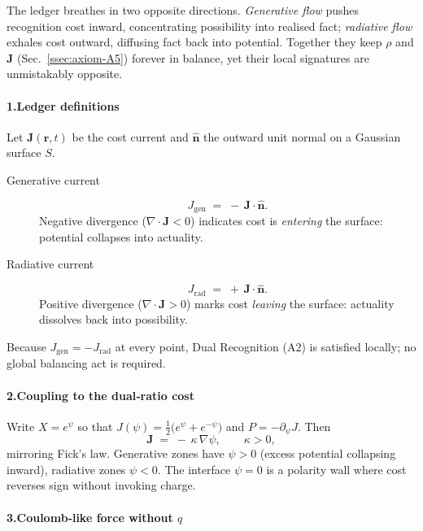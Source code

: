 \documentclass[11pt,oneside]{book}
\begin{document}
The ledger breathes in two opposite directions.  
\emph{Generative flow} pushes recognition cost inward, concentrating possibility into realised fact; \emph{radiative flow} exhales cost outward, diffusing fact back into potential.  
Together they keep $\rho$ and $\mathbf J$ (Sec.~\ref{ssec:axiom-A5}) forever in balance, yet their local signatures are unmistakably opposite.  

\paragraph*{1.\;Ledger definitions}

Let $\mathbf J(\mathbf r,t)$ be the cost current and $\widehat{\mathbf n}$ the outward unit normal on a Gaussian surface $S$.

\begin{description}
\item[Generative current]  
  \[
    J_{\text{gen}}
    \;=\;
    -\,\mathbf J\!\cdot\!\widehat{\mathbf n}.
  \]
  Negative divergence ($\nabla\!\cdot\!\mathbf J<0$) indicates cost is
  \emph{entering} the surface: potential collapses into actuality.

\item[Radiative current]  
  \[
    J_{\text{rad}}
    \;=\;
    +\,\mathbf J\!\cdot\!\widehat{\mathbf n}.
  \]
  Positive divergence ($\nabla\!\cdot\!\mathbf J>0$) marks cost
  \emph{leaving} the surface: actuality dissolves back into possibility.
\end{description}

\noindent
Because $J_{\text{gen}}=-J_{\text{rad}}$ at every point, Dual
Recognition (A2) is satisfied locally; no global balancing act is
required.

\paragraph*{2.\;Coupling to the dual‐ratio cost}

Write $X=e^{\psi}$ so that
$J(\psi)=\tfrac12\bigl(e^{\psi}+e^{-\psi}\bigr)$ and
$P=-\partial_\psi J$.  
Then
\[
  \mathbf J
  \;=\;
  -\,\kappa\,\nabla\psi,
  \qquad
  \kappa>0,
\]
mirroring Fick’s law.  
Generative zones have $\psi>0$ (excess potential collapsing inward),
radiative zones $\psi<0$.  
The interface $\psi=0$ is a polarity wall where cost reverses sign
without invoking charge.

\paragraph*{3.\;Coulomb‐like force without $q$}
\end{document}
